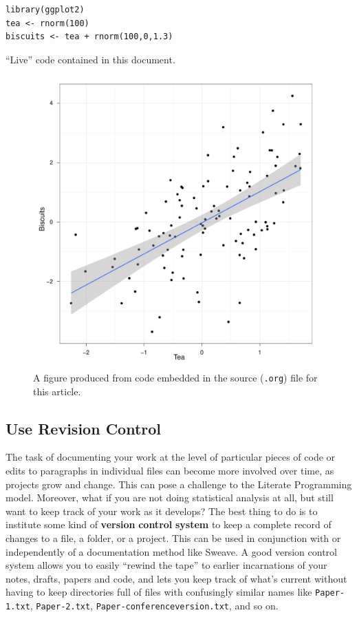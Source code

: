 \documentclass[11pt,article,oneside]{memoir}
\begin{document}
\begin{listing}
\begin{verbatim}
library(ggplot2)
tea <- rnorm(100)
biscuits <- tea + rnorm(100,0,1.3)
\end{verbatim}


\caption{``Live'' code contained in this document.}
\label{lst:babel}
\end{listing}


\begin{figure}[htb]
\centering
\includegraphics[width=4.5in]{figures/ggplot-example.pdf}
\caption{\label{fig:org-babel-example}A figure produced from code embedded in the source (\texttt{.org}) file for this article.}
\end{figure}

 
\subsection*{Use Revision Control}
\label{sec-6_3}

The task of documenting your work at the level of particular pieces of
code or edits to paragraphs in individual files can become more
involved over time, as projects grow and change. This can pose a
challenge to the Literate Programming model. Moreover, what if you are
not doing statistical analysis at all, but still want to keep track of
your work as it develops? The best thing to do is to institute some
kind of \textbf{version} \textbf{control} \textbf{system} to keep a
complete record of changes to a file, a folder, or a project. This can
be used in conjunction with or independently of a documentation method
like Sweave. A good version control system allows you to easily
``rewind the tape'' to earlier incarnations of your notes, drafts,
papers and code, and lets you keep track of what's current without
having to keep directories full of files with confusingly similar
names like \texttt{Paper-1.txt}, \texttt{Paper-2.txt},
\texttt{Paper-conferenceversion.txt}, and so on.
\end{document}

